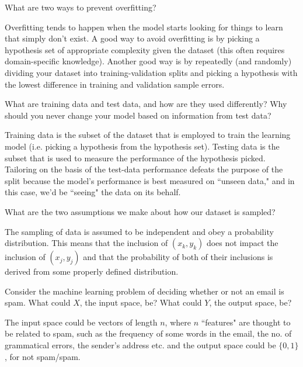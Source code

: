 \documentclass{article}
\begin{document}
\begin{problem}[2]
  What are two ways to prevent overfitting?
\end{problem}
\begin{solution}
  Overfitting tends to happen when the model starts looking for things to learn that simply don't exist. A good way to avoid overfitting is by picking a hypothesis set of appropriate complexity given the dataset (this often requires domain-specific knowledge). Another good way is by repeatedly (and randomly) dividing your dataset into training-validation splits and picking a hypothesis with the lowest difference in training and validation sample errors.
\end{solution}

\begin{problem}[2]
  What are training data and test data, and how are they used differently? Why should you never change your model based on information from test data?
\end{problem}
\begin{solution}
  Training data is the subset of the dataset that is employed to train the learning model (i.e. picking a hypothesis from the hypothesis set). Testing data is the subset that is used to measure the performance of the hypothesis picked. Tailoring  on the basis of the test-data performance defeats the purpose of the split because the model's performance is best measured on ``unseen data," and in this case, we'd be ``seeing" the data on its behalf.
  
\end{solution}
\newpage
\begin{problem}[2]
  What are the two assumptions we make about how our dataset is sampled?
\end{problem}
\begin{solution}
  The sampling of data is assumed to be independent and obey a probability distribution. This means that the inclusion of $(x_{k}, y_{k})$ does not impact the inclusion of $(x_j, y_j)$ and that the probability of both of their inclusions is derived from some properly defined distribution.
\end{solution}

\begin{problem}[2]
  Consider the machine learning problem of deciding whether or not an email is spam. What could $X$, the input space, be? What could $Y$, the output space, be?
\end{problem}
\begin{solution}
  The input space could be vectors of length $n$, where $n$ ``features" are thought to be related to spam, such as the frequency of some words in the email, the no. of grammatical errors, the sender's address etc. and the output space could be $\{0,1\}$, for not spam/spam. 
\end{solution}
\end{document}
